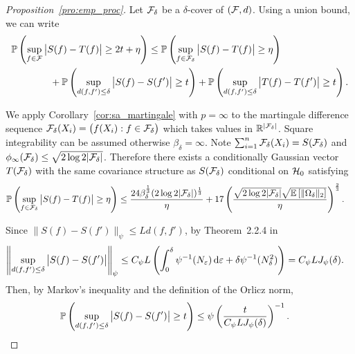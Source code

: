 \begin{proof}[Proposition~\ref{pro:emp_proc}]

  Let $\cF_\delta$ be a $\delta$-cover of $(\cF, d)$.
  Using a union bound, we can write
  \begin{align*}
    &\P\left(\sup_{f \in \cF}
      \big| S(f) - T(f) \big|
    \geq 2t + \eta \right)
    \leq
    \P\left(\sup_{f \in \cF_\delta}
      \big| S(f) - T(f) \big|
    \geq \eta \right) \\
    &\qquad\qquad+
    \P\left(\sup_{d(f,f') \leq \delta}
      \big| S(f) - S(f') \big|
    \geq t \right)
    + \P\left(\sup_{d(f,f') \leq \delta}
      \big| T(f) - T(f') \big|
    \geq t \right).
  \end{align*}


  We apply Corollary~\ref{cor:sa_martingale}
  with $p = \infty$ to the
  martingale difference sequence
  $\cF_\delta(X_i) = \big(f(X_i) : f \in \cF_\delta\big)$
  which takes values in $\R^{|\cF_\delta|}$.
  Square integrability can be assumed otherwise
  $\beta_\delta = \infty$.
  Note
  $\sum_{i=1}^n \cF_\delta(X_i) = S(\cF_\delta)$
  and $\phi_\infty(\cF_\delta) \leq \sqrt{2 \log 2 |\cF_\delta|}$.
  Therefore there exists a conditionally Gaussian vector $T(\cF_\delta)$
  with the same covariance structure as $S(\cF_\delta)$
  conditional on $\cH_0$ satisfying
  \begin{align*}
    \P\left(
      \sup_{f \in \cF_\delta}
      \big| S(f) - T(f) \big|
      \geq \eta
    \right)
    &\leq
    \frac{24\beta_\delta^{\frac{1}{3}}
    (2\log 2 |\cF_\delta|)^{\frac{1}{3}}}{\eta}
    + 17\left(\frac{\sqrt{2 \log 2 |\cF_\delta|}
    \sqrt{\E\left[\|\Omega_\delta\|_2\right]}}{\eta }\right)^{\frac{2}{3}}.
  \end{align*}


  Since $\big\| S(f) - S(f') \big\|_\psi \leq L d(f,f')$,
  by Theorem~2.2.4 in \citet{van1996weak}
  \begin{align*}
    \left\|
    \sup_{d(f,f') \leq \delta}
    \big| S(f) - S(f') \big|
    \right\|_\psi
    &\leq
    C_\psi L
    \left(
      \int_0^\delta
      \psi^{-1}(N_\varepsilon) \diff{\varepsilon}
      + \delta \psi^{-1}(N_\delta^2)
    \right)
    = C_\psi L J_\psi(\delta).
  \end{align*}
  Then, by Markov's inequality and the definition of the Orlicz norm,
  \begin{align*}
    \P\left(
      \sup_{d(f,f') \leq \delta}
      \big| S(f) - S(f') \big|
      \geq t
    \right)
    &\leq
    \psi\left(\frac{t}{C_\psi L J_\psi(\delta)} \right)^{-1}.
  \end{align*}


\end{proof}
